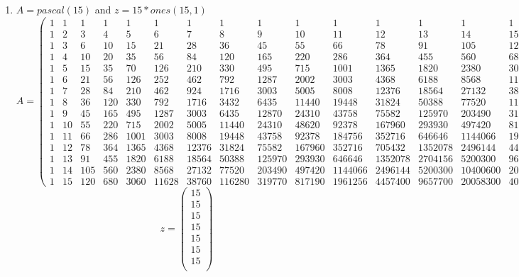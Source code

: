 \documentclass[12pt]{article}
\begin{document}
\begin{enumerate}
\item $A=pascal(15)$ and $z=15*ones(15,1)$
\[
A=\left(\begin{smallmatrix}
1 & 1 & 1 & 1 & 1 & 1 & 1 & 1 & 1 & 1 & 1 & 1 & 1 & 1 & 1 \\
1 & 2 & 3 & 4 & 5 & 6 & 7 & 8 & 9 & 10 & 11 & 12 & 13 & 14 & 15 \\
1 & 3 & 6 & 10 & 15 & 21 & 28 & 36 & 45 & 55 & 66 & 78 & 91 & 105 & 120 \\
1 & 4 & 10 & 20 & 35 & 56 & 84 & 120 & 165 & 220 & 286 & 364 & 455 & 560 & 680 \\
1 & 5 & 15 & 35 & 70 & 126 & 210 & 330 & 495 & 715 & 1001 & 1365 & 1820 & 2380 & 3060 \\
1 & 6 & 21 & 56 & 126 & 252 & 462 & 792 & 1287 & 2002 & 3003 & 4368 & 6188 & 8568 & 11628 \\
1 & 7 & 28 & 84 & 210 & 462 & 924 & 1716 & 3003 & 5005 & 8008 & 12376 & 18564 & 27132 & 38760 \\
1 & 8 & 36 & 120 & 330 & 792 & 1716 & 3432 & 6435 & 11440 & 19448 & 31824 & 50388 & 77520 & 116280 \\
1 & 9 & 45 & 165 & 495 & 1287 & 3003 & 6435 & 12870 & 24310 & 43758 & 75582 & 125970 & 203490 & 319770 \\
1 & 10 & 55 & 220 & 715 & 2002 & 5005 & 11440 & 24310 & 48620 & 92378 & 167960 & 293930 & 497420 & 817190 \\
1 & 11 & 66 & 286 & 1001 & 3003 & 8008 & 19448 & 43758 & 92378 & 184756 & 352716 & 646646 & 1144066 & 1961256 \\
1 & 12 & 78 & 364 & 1365 & 4368 & 12376 & 31824 & 75582 & 167960 & 352716 & 705432 & 1352078 & 2496144 & 4457400 \\
1 & 13 & 91 & 455 & 1820 & 6188 & 18564 & 50388 & 125970 & 293930 & 646646 & 1352078 & 2704156 & 5200300 & 9657700 \\
1 & 14 & 105 & 560 & 2380 & 8568 & 27132 & 77520 & 203490 & 497420 & 1144066 & 2496144 & 5200300 & 10400600 & 20058300 \\
1 & 15 & 120 & 680 & 3060 & 11628 & 38760 & 116280 & 319770 & 817190 & 1961256 & 4457400 & 9657700 & 20058300 & 40116600
\end{smallmatrix} \right)
\]
\[
z=\begin{pmatrix}
15 \\
15 \\
15 \\
15 \\
15 \\ 
15 \\
15 \\

\end{pmatrix}\]
\end{enumerate}
\end{document}
